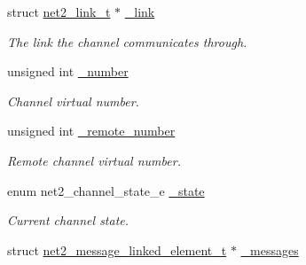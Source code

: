 \begin{DoxyCompactItemize}
\item 
\hypertarget{structnet2__channel__output__t_a8e678b9a5931b8d9d05e29e59cc0fa29}{}struct \hyperlink{structnet2__link__t}{net2\+\_\+link\+\_\+t} $\ast$ \hyperlink{structnet2__channel__output__t_a8e678b9a5931b8d9d05e29e59cc0fa29}{\+\_\+link}\label{structnet2__channel__output__t_a8e678b9a5931b8d9d05e29e59cc0fa29}

\begin{DoxyCompactList}\small\item\em The link the channel communicates through. \end{DoxyCompactList}\item 
\hypertarget{structnet2__channel__output__t_ad271c6722053d44e59fe7e1c50dda193}{}unsigned int \hyperlink{structnet2__channel__output__t_ad271c6722053d44e59fe7e1c50dda193}{\+\_\+number}\label{structnet2__channel__output__t_ad271c6722053d44e59fe7e1c50dda193}

\begin{DoxyCompactList}\small\item\em Channel virtual number. \end{DoxyCompactList}\item 
\hypertarget{structnet2__channel__output__t_af4e5410aaceaef8e8bb17d44b1a28a67}{}unsigned int \hyperlink{structnet2__channel__output__t_af4e5410aaceaef8e8bb17d44b1a28a67}{\+\_\+remote\+\_\+number}\label{structnet2__channel__output__t_af4e5410aaceaef8e8bb17d44b1a28a67}

\begin{DoxyCompactList}\small\item\em Remote channel virtual number. \end{DoxyCompactList}\item 
\hypertarget{structnet2__channel__output__t_a924791491eaed2c9f34f89ebe943abfd}{}enum net2\+\_\+channel\+\_\+state\+\_\+e \hyperlink{structnet2__channel__output__t_a924791491eaed2c9f34f89ebe943abfd}{\+\_\+state}\label{structnet2__channel__output__t_a924791491eaed2c9f34f89ebe943abfd}

\begin{DoxyCompactList}\small\item\em Current channel state. \end{DoxyCompactList}\item 
\hypertarget{structnet2__channel__output__t_a297f9515cb73f62847b127a55ad63a09}{}struct \hyperlink{structnet2__message__linked__element__t}{net2\+\_\+message\+\_\+linked\+\_\+element\+\_\+t} $\ast$ \hyperlink{structnet2__channel__output__t_a297f9515cb73f62847b127a55ad63a09}{\+\_\+messages}\label{structnet2__channel__output__t_a297f9515cb73f62847b127a55ad63a09}


\end{DoxyCompactItemize}
